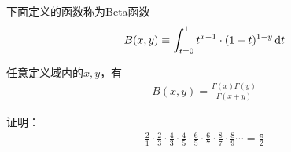 \begin{definition}[Beta函数]
  下面定义的函数称为Beta函数
  \begin{align}
    B(x,y)\equiv\int_{t=0}^1 t^{x-1} \cdot (1-t)^{1-y} \,\mathrm{d}t
  \end{align}
\end{definition}

\begin{question}
  任意定义域内的$x,y$，有
  \begin{align}
    B(x,y)=\frac{\Gamma(x)\Gamma(y)}{\Gamma(x+y)}
  \end{align}
\end{question}

\begin{question}
  证明：
  \begin{align}
    \frac21\cdot\frac23 \cdot\frac43 \cdot\frac45 \cdot\frac65 \cdot\frac67 \cdot\frac87
    \cdot\frac89\cdots=\frac\pi2
  \end{align}
\end{question}